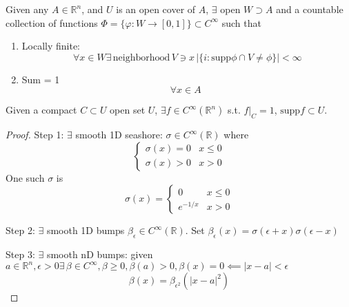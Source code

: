 \documentclass[a4paper]{article}
\numberwithin{equation}{section}
\newcommand{\R}{\mathbb{R}}
\begin{document}
\begin{theorem}
    Given any $A\in\R^n$, and $U$ is an open cover of $A$, $\exists$ open $W\supset A$ and a countable collection of functions $\Phi=\{\varphi:W\to[0,1]\}\subset C^\infty$ such that
    \begin{enumerate}
        \item Locally finite:
        \begin{equation}
            \forall x\in W\exists\,\text{neighborhood}\,V\ni x\,|\{i:\mathrm{supp}\phi\cap V\neq\phi\}|<\infty
        \end{equation}
        \item Sum = 1
        \begin{equation}
            \forall x\in A\,\
        \end{equation}
    \end{enumerate}
    \begin{lemma}
        Given a compact $C\subset U$ open set $U$, $\exists f\in C^\infty(\R^n)$ s.t. $f|_C=1$, $\mathrm{supp}f\subset U$.

        \begin{proof}
            Step 1: $\exists$ smooth 1D seashore: $\sigma\in C^\infty(\R)$ where
            \begin{equation}
                \begin{cases}
                    \sigma(x)=0 & x\leq 0\\
                    \sigma(x)>0 & x>0
                \end{cases}
            \end{equation}
            One such $\sigma$ is 
            \begin{equation}
                \sigma(x)=\begin{cases}
                    0 & x\leq 0\\
                    e^{-1/x} & x>0
                \end{cases}
            \end{equation}
            
            Step 2: $\exists$ smooth 1D bumps $\beta_\epsilon\in C^\infty(\R)$. Set $\beta_\epsilon(x)=\sigma(\epsilon+x)\sigma(\epsilon-x)$
            
            Step 3: $\exists$ smooth nD bumps: given $a\in\R^n,\epsilon>0\exists\,\beta\in C^\infty,\beta\geq0,\beta(a)>0,\beta(x)=0\impliedby|x-a|<\epsilon$
            \begin{equation}
                \beta(x)=\beta_{\epsilon^2}(|x-a|^2)
            \end{equation}


\end{proof}
\end{lemma}
\end{theorem}
\end{document}
